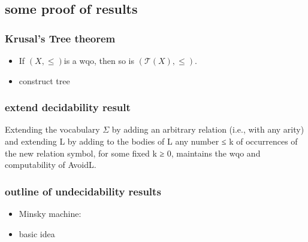 \subsection{some proof of results}
\begin{frame}
    \frametitle{Krusal's Tree theorem}
    \begin{itemize}
        \item If $(X,\le)$is a wqo, then so is $(\mathcal{T}(X),\le)$.
        \item construct tree
    \end{itemize}
\end{frame}
\begin{frame}
    \frametitle{extend decidability result}
    \begin{corollary}
        Extending the vocabulary $\varSigma $ by adding an arbitrary relation (i.e., with any arity) and extending L by adding to the bodies of L any number ≤ k of occurrences of the new relation symbol, for some fixed k ≥ 0, maintains the wqo and computability of AvoidL.
    \end{corollary}
\end{frame}
\begin{frame}
    \frametitle{outline of undecidability results}
    \begin{itemize}
        \item Minsky machine:
        \item basic idea
    \end{itemize}
\end{frame}
